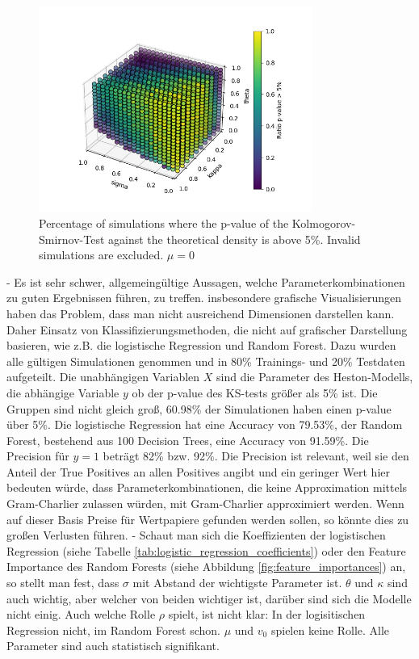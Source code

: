 \begin{figure}
    \centering
    \includegraphics[width=0.8\textwidth]{img/GC_cum_KS_3d_p_value_sigma_kappa_theta_muzero.png}
    \caption{Percentage of simulations where the p-value of the Kolmogorov-Smirnov-Test against the theoretical density is above 5\%. Invalid simulations are excluded. $\mu=0$}
    \label{fig:GC_cum_KS_3d_p_value_sigma_kappa_theta_muzero}
\end{figure}

- Es ist sehr schwer, allgemeingültige Aussagen, welche Parameterkombinationen zu guten Ergebnissen führen, zu treffen. insbesondere grafische Visualisierungen haben das Problem, dass man nicht ausreichend Dimensionen darstellen kann. Daher Einsatz von Klassifizierungsmethoden, die nicht auf grafischer Darstellung basieren, wie z.B. die logistische Regression und Random Forest. Dazu wurden alle gültigen Simulationen genommen und in 80\% Trainings- und 20\% Testdaten aufgeteilt. Die unabhängigen Variablen $X$ sind die Parameter des Heston-Modells, die abhängige Variable $y$ ob der p-value des KS-tests größer als 5\% ist. Die Gruppen sind nicht gleich groß, 60.98\% der Simulationen haben einen p-value über 5\%. Die logistische Regression hat eine Accuracy von 79.53\%, der Random Forest, bestehend aus 100 Decision Trees, eine Accuracy von 91.59\%. Die Precision für $y=1$ beträgt 82\% bzw. 92\%. Die Precision ist relevant, weil sie den Anteil der True Positives an allen Positives angibt und ein geringer Wert hier bedeuten würde, dass Parameterkombinationen, die keine Approximation mittels Gram-Charlier zulassen würden, mit Gram-Charlier approximiert werden. Wenn auf dieser Basis Preise für Wertpapiere gefunden werden sollen, so könnte dies zu großen Verlusten führen.
- Schaut man sich die Koeffizienten der logistischen Regression (siehe Tabelle \ref{tab:logistic_regression_coefficients}) oder den Feature Importance des Random Forests (siehe Abbildung \ref{fig:feature_importances}) an, so stellt man fest, dass $\sigma$ mit Abstand der wichtigste Parameter ist. $\theta$ und $\kappa$ sind auch wichtig, aber welcher von beiden wichtiger ist, darüber sind sich die Modelle nicht einig. Auch welche Rolle $\rho$ spielt, ist nicht klar: In der logisitischen Regression nicht, im Random Forest schon. $\mu$ und $v_0$ spielen keine Rolle. Alle Parameter sind auch statistisch signifikant.


